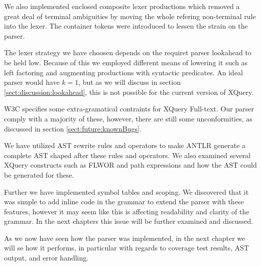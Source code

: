 We also implemented enclosed composite lexer productions which removed a great
deal of terminal ambiguities by moving the whole refering non-terminal rule
into the lexer. The container tokens were introduced to lessen the strain on
the parser.

The lexer strategy we have choosen depends on the requiret parser lookahead to
be held low. Because of this we employed different means of lowering it such as
left factoring and augmenting productions with syntactic predicates. An ideal
parser would have $k=1$, but as we will discuss in section
\ref{sect:discussion:lookahead}, this is not possible for the current version
of XQuery.

W3C specifies some extra-gramatical contraints for XQuery Full-text. Our parser
comply with a majority of these, however, there are still some
unconformities, as discussed in section \ref{sect:future:knownBugs}.  

We have utilized AST rewrite rules and operators to make
ANTLR generate a complete AST shaped after these rules and operators. We also
examined several XQuery constructs such as FLWOR and path expressions and how
the AST could be generated for these.

Further we have implemented symbol tables and scoping. We discovered that it was
simple to add inline code in the grammar to extend the parser with these
features, however it may seem like this is affecting readability and clarity of
the grammar. In the next chapters this issue will be further examined and
discussed.

As we now have seen how the parser was implemented, in the next chapter we will
se how it performs, in particular with regards to coverage test results, AST
output, and error handling.